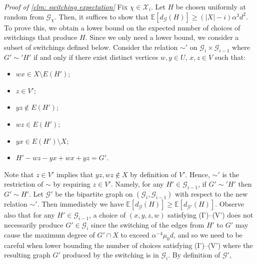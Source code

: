 \documentclass[11pt]{article}
\theoremstyle{plain}
\begin{document}
\medskip
\noindent\textit{Proof of \cref{clm: switching expectation}}
Fix $\chi \in \mathcal {X}_{i}$. Let $H$ be chosen uniformly at random from $\mathcal {G}_\chi$.
Then, it suffices to show that
$ \mathbb E[d_{\mathscr G}(H)] \ge (|X| - i)\alpha^3d^2$. 
       To prove this, we obtain a lower bound on the expected number of choices of switchings that produce $H$. Since we only need a lower bound, we consider a subset of switchings defined below. Consider the relation $\sim'$ on ${\mathcal G}_i\times {\mathcal G}_{i-1}$ where $G' \sim' H'$ if and only if there exist distinct vertices $w,y\in U$, $x,z \in V$ such that:
        \begin{itemize}
            \item[(I)] $wx \in X \setminus E(H')$;
            \item[(II)] $z \in V'$;
            \item[(III)] $yz \notin E(H')$;
            \item[(IV)] $wz \in E(H')$;
            \item[(V)] $yx \in E(H')\setminus X$;
            \item[(VI)] $H' - wz- yx + wx+ yz = G'$.
        \end{itemize}
Note that $z\in V'$ implies that $yz,wz\notin X$ by definition of $V'$. Hence, $\sim'$ is the restriction of $\sim$ by requiring $z\in V'$. Namely, for any $H'\in \mathcal{G}_{i-1}$, if $G'\sim' H'$ then $G'\sim H'$. 
Let $\mathscr{G}'$ be the bipartite graph on $(\mathcal{G}_i,\mathcal{G}_{i-1})$ with respect to the new relation $\sim'$. Then immediately we have $ \mathbb E[d_{\mathscr G}(H)] \ge  \mathbb E[d_{\mathscr G'}(H)] $.
Observe also that for any $H'\in {\mathcal G}_{i-1}$, a choice of $(x,y,z,w)$ satisfying (I')--(V') does not necessarily produce $G'\in {\mathcal G}_i$ since the switching of the edges from $H'$ to $G'$ may cause the maximum degree of $G'\cap X$ to exceed $\alpha^{-4}\mu_0 d$, and so we need to be careful when lower bounding the number of choices satisfying (I')--(V') where the resulting graph $G'$ produced by the switching is in ${\mathcal G}_{i}$.
By definition of ${\mathscr G}'$,



       
       
\end{document}
